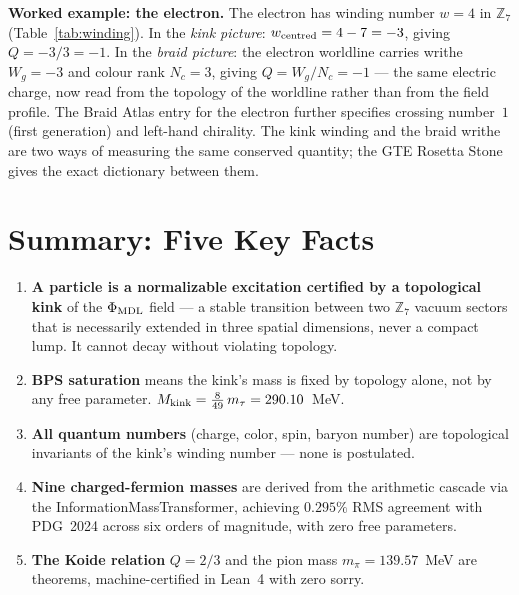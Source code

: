 \documentclass[11pt,a4paper]{article}
\newcommand{\Mkink}{M_{\rm kink}}
\begin{document}
\textbf{Worked example: the electron.}
The electron has winding number $w = 4$ in $\mathbb{Z}_7$ (Table~\ref{tab:winding}).
In the \emph{kink picture}: $w_{\rm centred} = 4 - 7 = -3$, giving $Q = -3/3 = -1$.
In the \emph{braid picture}: the electron worldline carries writhe $W_g = -3$ and
colour rank $N_c = 3$, giving $Q = W_g/N_c = -1$ --- the same electric charge, now
read from the topology of the worldline rather than from the field profile.
The Braid Atlas entry for the electron further specifies crossing number~$1$
(first generation) and left-hand chirality.
The kink winding and the braid writhe are two ways of measuring the same conserved
quantity; the GTE Rosetta Stone~\cite{SpivackBraidAtlas} gives the exact dictionary
between them.

\section{Summary: Five Key Facts}
\label{sec:summary}

\begin{tcolorbox}[colback=boxpurple,colframe=blue!40!black,
  title=The five things to remember]
\begin{enumerate}[itemsep=4pt]
\item \textbf{A particle is a normalizable excitation certified by a topological
  kink} of the $\Phi_{\rm MDL}$ field — a stable transition between two
  $\mathbb{Z}_7$ vacuum sectors that is necessarily extended in three spatial
  dimensions, never a compact lump.  It cannot decay without violating topology.

\item \textbf{BPS saturation} means the kink's mass is fixed by topology alone,
  not by any free parameter.  $\Mkink = \tfrac{8}{49}\,m_\tau = 290.10$~MeV.

\item \textbf{All quantum numbers} (charge, color, spin, baryon number) are
  topological invariants of the kink's winding number — none is postulated.

\item \textbf{Nine charged-fermion masses} are derived from the arithmetic
  cascade via the InformationMassTransformer, achieving $0.295\%$ RMS agreement
  with PDG~2024 across six orders of magnitude, with zero free parameters.

\item \textbf{The Koide relation} $Q = 2/3$ and the pion mass $m_\pi = 139.57$~MeV
  are theorems, machine-certified in Lean~4 with zero sorry.
\end{enumerate}
\end{tcolorbox}
\end{document}
